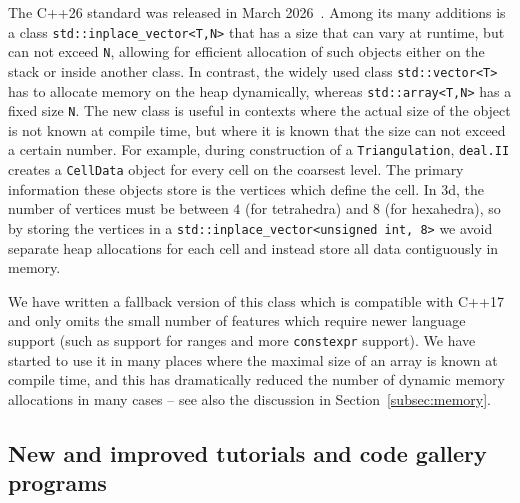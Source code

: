 \documentclass{ansarticle-preprint}
\newcommand{\specialword}[1]{\texttt{#1}}
\newcommand{\dealii}{{\specialword{deal.II}}\xspace}
\begin{document}
The C++26 standard was released in March 2026~\cite{cpp26}.
Among its many additions is a class \texttt{std::inplace\_vector<T,N>} that
has a size that can vary at runtime, but can not exceed \texttt{N},
allowing for efficient allocation of such objects either on the stack or
inside another class. In contrast, the widely used class
\texttt{std::vector<T>} has to allocate memory on the heap dynamically,
whereas \texttt{std::array<T,N>} has a fixed size \texttt{N}. The new
class is useful in contexts where the actual size of the object is not
known at compile time, but where it is known that the size can not
exceed a certain number. For example, during construction of a
\texttt{Triangulation}, \dealii creates a \texttt{CellData} object for
every cell on the coarsest level. The primary information these objects
store is the vertices which define the cell. In 3d, the number of
vertices must be between $4$ (for tetrahedra) and $8$ (for hexahedra),
so by storing the vertices in a
\texttt{std::inplace\_vector<unsigned int, 8>}
we avoid separate heap allocations for each cell and instead
store all data contiguously in memory.

We have written a fallback version of this class which is compatible
with C++17 and only omits the small number of features which require
newer language support (such as support for ranges and more
\texttt{constexpr} support). We have started to use it in many places
where the maximal size of an array is known at compile time, and this has
dramatically reduced the number of dynamic memory allocations in many
cases -- see also the discussion in Section~\ref{subsec:memory}.


\subsection{New and improved tutorials and code gallery programs}
\label{subsec:steps}
\end{document}
